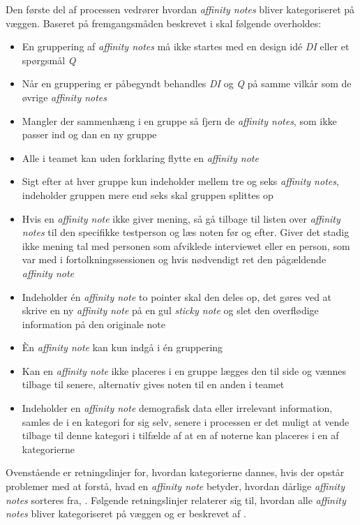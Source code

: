 Den første del af processen vedrører hvordan \textit{affinity notes} bliver kategoriseret på væggen. Baseret på fremgangsmåden beskrevet i \textcite[ss. 166-168]{Book:BuildingAnAffinity} skal følgende overholdes: \blankline
%
\begin{itemize}
  \item En gruppering af \textit{affinity notes} må ikke startes med en design idé \textit{DI} eller et spørgsmål \textit{Q}
  \item Når en gruppering er påbegyndt behandles \textit{DI} og \textit{Q} på samme vilkår som de øvrige \textit{affinity notes}
  \item Mangler der sammenhæng i en gruppe så fjern de \textit{affinity notes}, som ikke passer ind og dan en ny gruppe
  \item Alle i teamet kan uden forklaring flytte en \textit{affinity note}
  \item Sigt efter at hver gruppe kun indeholder mellem tre og seks \textit{affinity notes}, indeholder gruppen mere end seks skal gruppen splittes op
  \item Hvis en \textit{affinity note} ikke giver mening, så gå tilbage til listen over \textit{affinity notes} til den specifikke testperson og læs noten før og efter. Giver det stadig ikke mening tal med personen som afviklede interviewet eller en person, som var med i fortolkningssessionen og hvis nødvendigt ret den pågældende \textit{affinity note}
  \item Indeholder én \textit{affinity note} to pointer skal den deles op, det gøres ved at skrive en ny \textit{affinity note} på en gul \textit{sticky note} og slet den overflødige information på den originale note
  \item Èn \textit{affinity note} kan kun indgå i én gruppering
  \item Kan en \textit{affinity note} ikke placeres i en gruppe lægges den til side og vænnes tilbage til senere, alternativ gives noten til en anden i teamet
  \item Indeholder en \textit{affinity note} demografisk data eller irrelevant information, samles de i en kategori for sig selv, senere i processen er det muligt at vende tilbage til denne kategori i tilfælde af at en af noterne kan placeres i en af kategorierne \blankline
\end{itemize}
%
Ovenstående er retningslinjer for, hvordan kategorierne dannes, hvis der opstår problemer med at forstå, hvad en \textit{affinity note} betyder, hvordan dårlige \textit{affinity notes} sorteres fra, \parencite[ss. 166-168]{Book:BuildingAnAffinity}. Følgende retningslinjer relaterer sig til, hvordan alle \textit{affinity notes} bliver kategoriseret på væggen og er beskrevet af \textcite[s. 168]{Book:BuildingAnAffinity}.\blankline
